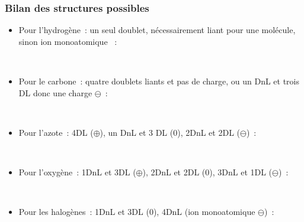 \documentclass[../main/main.tex]{subfiles}
\begin{document}
\subsubsection{Bilan des structures possibles}
\begin{itemize}[label=$\diamond$]
    \item Pour l'hydrogène~: un seul doublet, nécessairement liant pour une
        molécule, sinon ion monoatomique ~:
        \begin{center}
            \hfill
            \hfill
            \hfill~
        \end{center}
    \item Pour le carbone~: quatre doublets liants et pas de charge, ou un DnL
        et trois DL donc une charge $\ominus$~:
        \begin{center}
            \hfill
            \hfill
            \hfill~
        \end{center}
    \item Pour l'azote~: 4DL ($\oplus$), un DnL et 3 DL (0), 2DnL et 2DL
        ($\ominus$)~:
        \begin{center}
            \hfill
            \hfill
            \hfill
            \hfill~
        \end{center}
    \item Pour l'oxygène~: 1DnL et 3DL ($\oplus$), 2DnL et 2DL (0), 3DnL et 1DL
        ($\ominus$)~:
        \begin{center}
            \hfill
            \hfill
            \hfill
            \hfill~
        \end{center}
    \item Pour les halogènes~: 1DnL et 3DL (0), 4DnL (ion monoatomique
        $\ominus$)~:
        \begin{center}
            \hfill
            \hfill
            \hfill~
        \end{center}
\end{itemize}
\end{document}

